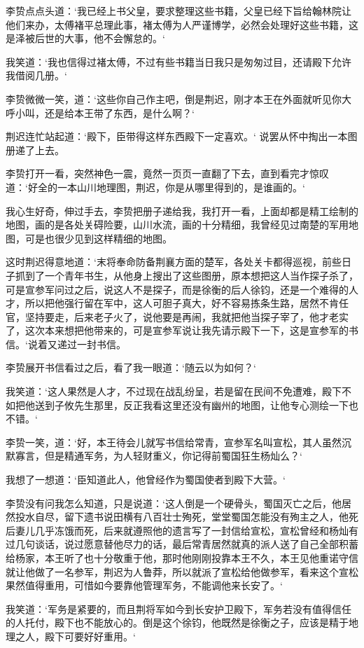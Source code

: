 李贽点点头道：‘我已经上书父皇，要求整理这些书籍，父皇已经下旨给翰林院让他们来办，太傅褚平总理此事，褚太傅为人严谨博学，必然会处理好这些书籍，这是泽被后世的大事，他不会懈怠的。‘

我笑道：‘我也信得过褚太傅，不过有些书籍当日我只是匆匆过目，还请殿下允许我借阅几册。‘

李贽微微一笑，道：‘这些你自己作主吧，倒是荆迟，刚才本王在外面就听见你大呼小叫，还是给本王带了东西，是什么啊？‘

荆迟连忙站起道：‘殿下，臣带得这样东西殿下一定喜欢。‘ 说罢从怀中掏出一本图册递了上去。

李贽打开一看，突然神色一震，竟然一页页一直翻了下去，直到看完才惊叹道：‘好全的一本山川地理图，荆迟，你是从哪里得到的，是谁画的。‘

我心生好奇，伸过手去，李贽把册子递给我，我打开一看，上面却都是精工绘制的地图，画的是各处关碍险要，山川水流，画的十分精细，我曾经见过南楚的军用地图，可是也很少见到这样精细的地图。

这时荆迟得意地道：‘末将奉命防备荆襄方面的楚军，各处关卡都得巡视，前些日子抓到了一个青年书生，从他身上搜出了这些图册，原本想把这人当作探子杀了，可是宣参军问过之后，说这人不是探子，而是徐衡的后人徐钧，还是一个难得的人才，所以把他强行留在军中，这人可胆子真大，好不容易拣条生路，居然不肯任官，坚持要走，后来老子火了，说他要是再闹，我就把他当探子宰了，他才老实了，这次本来想把他带来的，可是宣参军说让我先请示殿下一下，这是宣参军的书信。‘说着又递过一封书信。

李贽展开书信看过之后，看了我一眼道：‘随云以为如何？‘

我笑道：‘这人果然是人才，不过现在战乱纷呈，若是留在民间不免遭难，殿下不如把他送到子攸先生那里，反正我看这里还没有幽州的地图，让他专心测绘一下也不错。‘

李贽一笑，道：‘好，本王待会儿就写书信给常青，宣参军名叫宣松，其人虽然沉默寡言，但是精通军务，为人轻财重义，你记得前蜀国狂生杨灿么？‘

我想了一想道：‘臣知道此人，他曾经作为蜀国使者到殿下大营。‘

李贽没有问我怎么知道，只是说道：‘这人倒是一个硬骨头，蜀国灭亡之后，他居然投水自尽，留下遗书说田横有八百壮士殉死，堂堂蜀国怎能没有殉主之人，他死后妻儿几乎冻饿而死，后来就遵照他的遗言写了一封信给宣松，宣松曾经和杨灿有过几句谈话，说过愿意替他尽力的话，最后常青居然就真的派人送了自己全部积蓄给杨家，本王听了也十分敬重于他，那时他刚刚投靠本王不久，本王见他重诺守信就让他做了一名参军，荆迟为人鲁莽，所以就派了宣松给他做参军，看来这个宣松果然值得重用，可惜如今要靠他管理军务，不能调他来长安了。‘

我笑道：‘军务是紧要的，而且荆将军如今到长安护卫殿下，军务若没有值得信任的人托付，殿下也不能放心的。倒是这个徐钧，他既然是徐衡之子，应该是精于地理之人，殿下可要好好重用。‘

